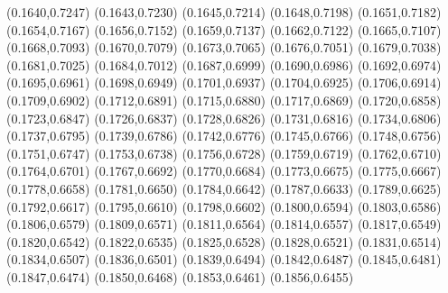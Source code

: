 \PST@Filltriangle(0.1640,0.7247)
\PST@Filltriangle(0.1643,0.7230)
\PST@Filltriangle(0.1645,0.7214)
\PST@Filltriangle(0.1648,0.7198)
\PST@Filltriangle(0.1651,0.7182)
\PST@Filltriangle(0.1654,0.7167)
\PST@Filltriangle(0.1656,0.7152)
\PST@Filltriangle(0.1659,0.7137)
\PST@Filltriangle(0.1662,0.7122)
\PST@Filltriangle(0.1665,0.7107)
\PST@Filltriangle(0.1668,0.7093)
\PST@Filltriangle(0.1670,0.7079)
\PST@Filltriangle(0.1673,0.7065)
\PST@Filltriangle(0.1676,0.7051)
\PST@Filltriangle(0.1679,0.7038)
\PST@Filltriangle(0.1681,0.7025)
\PST@Filltriangle(0.1684,0.7012)
\PST@Filltriangle(0.1687,0.6999)
\PST@Filltriangle(0.1690,0.6986)
\PST@Filltriangle(0.1692,0.6974)
\PST@Filltriangle(0.1695,0.6961)
\PST@Filltriangle(0.1698,0.6949)
\PST@Filltriangle(0.1701,0.6937)
\PST@Filltriangle(0.1704,0.6925)
\PST@Filltriangle(0.1706,0.6914)
\PST@Filltriangle(0.1709,0.6902)
\PST@Filltriangle(0.1712,0.6891)
\PST@Filltriangle(0.1715,0.6880)
\PST@Filltriangle(0.1717,0.6869)
\PST@Filltriangle(0.1720,0.6858)
\PST@Filltriangle(0.1723,0.6847)
\PST@Filltriangle(0.1726,0.6837)
\PST@Filltriangle(0.1728,0.6826)
\PST@Filltriangle(0.1731,0.6816)
\PST@Filltriangle(0.1734,0.6806)
\PST@Filltriangle(0.1737,0.6795)
\PST@Filltriangle(0.1739,0.6786)
\PST@Filltriangle(0.1742,0.6776)
\PST@Filltriangle(0.1745,0.6766)
\PST@Filltriangle(0.1748,0.6756)
\PST@Filltriangle(0.1751,0.6747)
\PST@Filltriangle(0.1753,0.6738)
\PST@Filltriangle(0.1756,0.6728)
\PST@Filltriangle(0.1759,0.6719)
\PST@Filltriangle(0.1762,0.6710)
\PST@Filltriangle(0.1764,0.6701)
\PST@Filltriangle(0.1767,0.6692)
\PST@Filltriangle(0.1770,0.6684)
\PST@Filltriangle(0.1773,0.6675)
\PST@Filltriangle(0.1775,0.6667)
\PST@Filltriangle(0.1778,0.6658)
\PST@Filltriangle(0.1781,0.6650)
\PST@Filltriangle(0.1784,0.6642)
\PST@Filltriangle(0.1787,0.6633)
\PST@Filltriangle(0.1789,0.6625)
\PST@Filltriangle(0.1792,0.6617)
\PST@Filltriangle(0.1795,0.6610)
\PST@Filltriangle(0.1798,0.6602)
\PST@Filltriangle(0.1800,0.6594)
\PST@Filltriangle(0.1803,0.6586)
\PST@Filltriangle(0.1806,0.6579)
\PST@Filltriangle(0.1809,0.6571)
\PST@Filltriangle(0.1811,0.6564)
\PST@Filltriangle(0.1814,0.6557)
\PST@Filltriangle(0.1817,0.6549)
\PST@Filltriangle(0.1820,0.6542)
\PST@Filltriangle(0.1822,0.6535)
\PST@Filltriangle(0.1825,0.6528)
\PST@Filltriangle(0.1828,0.6521)
\PST@Filltriangle(0.1831,0.6514)
\PST@Filltriangle(0.1834,0.6507)
\PST@Filltriangle(0.1836,0.6501)
\PST@Filltriangle(0.1839,0.6494)
\PST@Filltriangle(0.1842,0.6487)
\PST@Filltriangle(0.1845,0.6481)
\PST@Filltriangle(0.1847,0.6474)
\PST@Filltriangle(0.1850,0.6468)
\PST@Filltriangle(0.1853,0.6461)
\PST@Filltriangle(0.1856,0.6455)
